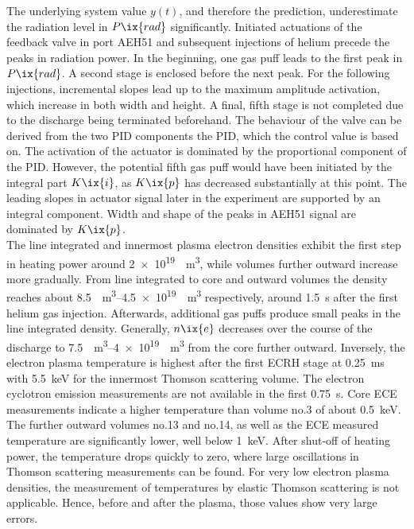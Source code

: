             The underlying system value $y\left(t\right)$, and therefore the prediction, underestimate the radiation level in $P\ix{rad}$ significantly. Initiated actuations of the feedback valve in port AEH51 and subsequent injections of helium precede the peaks in radiation power. In the beginning, one gas puff leads to the first peak in $P\ix{rad}$. A second stage is enclosed before the next peak. For the following injections, incremental slopes lead up to the maximum amplitude activation, which increase in both width and height. A final, fifth stage is not completed due to the discharge being terminated beforehand. The behaviour of the valve can be derived from the two PID components the PID, which the control value is based on. The activation of the actuator is dominated by the proportional component of the PID. However, the potential fifth gas puff would have been initiated by the integral part $K\ix{i}$, as $K\ix{p}$ has decreased substantially at this point. The leading slopes in actuator signal later in the experiment are supported by an integral component. Width and shape of the peaks in AEH51 signal are dominated by $K\ix{p}$.\\%
            The line integrated and innermost plasma electron densities exhibit the first step in heating power around \SI[per-mode=reciprocal]{2e19}{\per\cubic\meter}, while volumes further outward increase more gradually. From line integrated to core and outward volumes the density reaches about \SIrange[per-mode=reciprocal]{8.5}{4.5e19}{\per\cubic\meter} respectively, around \SI{1.5}{\second} after the first helium gas injection. Afterwards, additional gas puffs produce small peaks in the line integrated density. Generally, $n\ix{e}$ decreases over the course of the discharge to \SIrange[per-mode=reciprocal]{7.5}{4e19}{\per\cubic\meter} from the core further outward. Inversely, the electron plasma temperature is highest after the first ECRH stage at \SI{0.25}{\milli\second} with \SI{5.5}{\kilo\electronvolt} for the innermost Thomson scattering volume. The electron cyclotron emission measurements are not available in the first \SI{0.75}{\second}. Core ECE measurements indicate a higher temperature than volume no.3 of about \SI{0.5}{\kilo\electronvolt}. The further outward volumes no.13 and no.14, as well as the ECE measured temperature are significantly lower, well below \SI{1}{\kilo\electronvolt}. After shut-off of heating power, the temperature drops quickly to zero, where large oscillations in Thomson scattering measurements can be found. For very low electron plasma densities, the measurement of temperatures by elastic Thomson scattering is not applicable. Hence, before and after the plasma, those values show very large errors.\\%
